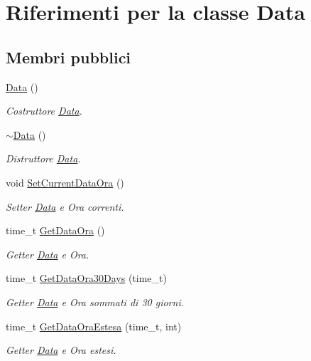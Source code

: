 \hypertarget{class_data}{}\section{Riferimenti per la classe Data}
\label{class_data}
\subsection*{Membri pubblici}
\begin{DoxyCompactItemize}
\item 
\mbox{\label{class_data_af11f741cb7f587e2e495452a8905a22a}} 
\mbox{\hyperlink{class_data_af11f741cb7f587e2e495452a8905a22a}{Data}} ()
\begin{DoxyCompactList}\small\item\em Costruttore \mbox{\hyperlink{class_data}{Data}}. \end{DoxyCompactList}\item 
\mbox{\label{class_data_aab31956423290f0d62dcca47ab4d16dd}} 
\mbox{\hyperlink{class_data_aab31956423290f0d62dcca47ab4d16dd}{$\sim$\+Data}} ()
\begin{DoxyCompactList}\small\item\em Distruttore \mbox{\hyperlink{class_data}{Data}}. \end{DoxyCompactList}\item 
void \mbox{\hyperlink{class_data_a0f77e10131654f6588e1ed935c8b5926}{Set\+Current\+Data\+Ora}} ()
\begin{DoxyCompactList}\small\item\em Setter \mbox{\hyperlink{class_data}{Data}} e Ora correnti. \end{DoxyCompactList}\item 
time\+\_\+t \mbox{\hyperlink{class_data_ab27ede34460ad63d6e3ee2567b3be0d9}{Get\+Data\+Ora}} ()
\begin{DoxyCompactList}\small\item\em Getter \mbox{\hyperlink{class_data}{Data}} e Ora. \end{DoxyCompactList}\item 
time\+\_\+t \mbox{\hyperlink{class_data_aaf254a17c4ad07af79effbd50df887d7}{Get\+Data\+Ora30\+Days}} (time\+\_\+t)
\begin{DoxyCompactList}\small\item\em Getter \mbox{\hyperlink{class_data}{Data}} e Ora sommati di 30 giorni. \end{DoxyCompactList}\item 
time\+\_\+t \mbox{\hyperlink{class_data_a67b1a6fc8bdd632c2bd582206df3c0b7}{Get\+Data\+Ora\+Estesa}} (time\+\_\+t, int)
\begin{DoxyCompactList}\small\item\em Getter \mbox{\hyperlink{class_data}{Data}} e Ora estesi. \end{DoxyCompactList}\end{DoxyCompactItemize}


